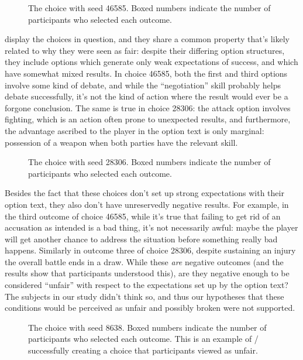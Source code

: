 \begin{figure}[!b]
\caption[``Unexpected failure'' choice 46585]{The \unxf{} choice with seed 46585. Boxed numbers indicate the number of participants who selected each outcome.}
\label{fig:e2-seed-46585}
\end{figure}


 display the choices in question, and they share a common property that's likely related to why they were seen as fair: despite their differing option structures, they include options which generate only weak expectations of success, and which have somewhat mixed results.
%
In choice 46585, both the first and third options involve some kind of debate, and while the ``negotiation'' skill probably helps debate successfully, it's not the kind of action where the result would ever be a forgone conclusion.
%
The same is true in choice 28306: the attack option involves fighting, which is an action often prone to unexpected results, and furthermore, the advantage ascribed to the player in the option text is only marginal: possession of a weapon when both parties have the relevant skill.

\begin{figure}[t]
\caption[``Obvious Failure'' choice 28306]{The \obvf{} choice with seed 28306. Boxed numbers indicate the number of participants who selected each outcome.}
\label{fig:e2-seed-28306}
\end{figure}


Besides the fact that these choices don't set up strong expectations with their option text, they also don't have unreservedly negative results.
%
For example, in the third outcome of choice 46585, while it's true that failing to get rid of an accusation as intended is a bad thing, it's not necessarily awful: maybe the player will get another chance to address the situation before something really bad happens.
%
Similarly in outcome three of choice 28306, despite sustaining an injury the overall battle ends in a draw.
%
While these \emph{are} negative outcomes (and the results show that participants understood this), are they negative enough to be considered ``unfair'' with respect to the expectations set up by the option text?
%
The subjects in our study didn't think so, and thus our hypotheses that these conditions would be perceived as unfair and possibly broken were not supported.

\begin{figure}[!t]
\caption[``Obvious Failure'' choice 8638]{The \obvf{} choice with seed 8638. Boxed numbers indicate the number of participants who selected each outcome. This is an example of \dunyazad/ successfully creating a choice that participants viewed as unfair.}
\label{fig:e2-seed-8638}
\end{figure}


